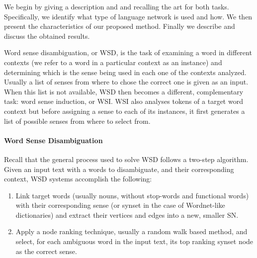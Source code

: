 We begin by giving a description and and recalling the art for both tasks. Specifically, we identify what type of language network is used and how.
We then present the characteristics of our proposed method. Finally we describe and discuss the obtained results.


Word sense disambiguation, or WSD, is the task of examining a word in different contexts (we refer to a word in a particular context as an instance)  and determining which is the sense being used in each one of the contexts analyzed. Usually a list of senses from where to chose the correct one is given as an input. When this list is not available, WSD then becomes a different, complementary task: word sense induction, or WSI. WSI also analyses  tokens of a target word context but before assigning a sense to each of its instances, it first generates a list of possible senses from where to select from. 

\paragraph{Word Sense Disambiguation}

Recall that the general process used to solve WSD follows a two-step algorithm. Given an input text with a words to disambiguate, and their corresponding context, WSD systems accomplish the following:
\begin{enumerate}
\item Link target words (usually nouns, without stop-words and functional words) with their corresponding  sense (or synset in the case of Wordnet-like dictionaries) and extract their vertices and edges into a new, smaller SN. 
\item Apply a node ranking technique, usually a random walk based method, and select, for each ambiguous word in the input text,  its top ranking synset node as the correct sense.
\end{enumerate}


